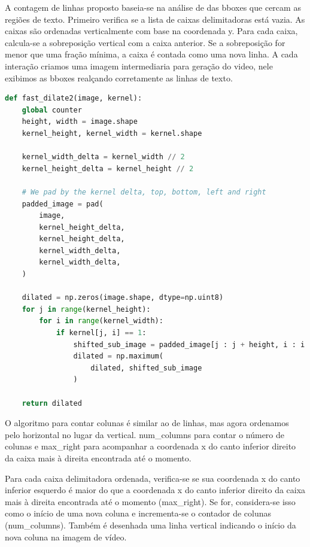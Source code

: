 \documentclass[english, 
               brazil, 
               bsc] %
               {dcomp-abntex2}
\begin{document}
A contagem de linhas proposto baseia-se na análise de das bboxes que cercam as regiões de texto.
Primeiro verifica se a lista de caixas delimitadoras está vazia. As caixas são ordenadas verticalmente com base na coordenada y. Para cada caixa, calcula-se a sobreposição vertical com a caixa anterior. Se a sobreposição for menor que uma fração mínima, a caixa é contada como uma nova linha. A cada interação criamos uma imagem intermediaria para geração do video, nele exibimos as bboxes realçando corretamente as linhas de texto.

\begin{codigo}[h]
  \caption{\small.}
 \label{fdilate2}
\begin{lstlisting}[language=python]
def fast_dilate2(image, kernel):
    global counter 
    height, width = image.shape
    kernel_height, kernel_width = kernel.shape

    kernel_width_delta = kernel_width // 2
    kernel_height_delta = kernel_height // 2

    # We pad by the kernel delta, top, bottom, left and right
    padded_image = pad(
        image,
        kernel_height_delta,
        kernel_height_delta,
        kernel_width_delta,
        kernel_width_delta,
    )

    dilated = np.zeros(image.shape, dtype=np.uint8)
    for j in range(kernel_height):
        for i in range(kernel_width):
            if kernel[j, i] == 1:
                shifted_sub_image = padded_image[j : j + height, i : i + width]
                dilated = np.maximum(
                    dilated, shifted_sub_image
                )

    return dilated
\end{lstlisting}
\end{codigo}

O algoritmo para contar colunas é similar ao de linhas, mas agora ordenamos pelo horizontal no lugar da vertical.
num_columns para contar o número de colunas e max_right para acompanhar a coordenada x do canto inferior direito da caixa mais à direita encontrada até o momento.

Para cada caixa delimitadora ordenada, verifica-se se sua coordenada x do canto inferior esquerdo é maior do que a coordenada x do canto inferior direito da caixa mais à direita encontrada até o momento (max_right). Se for, considera-se isso como o início de uma nova coluna e incrementa-se o contador de colunas (num_columns). Também é desenhada uma linha vertical indicando o início da nova coluna na imagem de vídeo.
\end{document}
